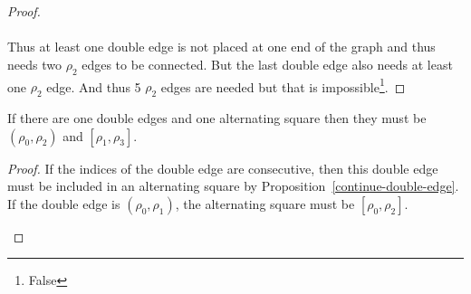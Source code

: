 \begin{proof}
  \paragraph{}
  Thus at least one double edge is not placed at one end of the graph and thus needs two $\rho_2$ edges to be connected. But the last double edge also needs at least one $\rho_2$ edge. And thus 5 $\rho_2$ edges are needed but that is impossible\footnote{False}.

\end{proof}

\begin{lemma}
  If there are one double edges and one alternating square then they must be $(\rho_0, \rho_2)$ and $[\rho_1, \rho_3]$.
\end{lemma}

\begin{proof}
  If the indices of the double edge are consecutive, then this double edge must be included in an alternating square by Proposition~\ref{continue-double-edge}. If the double edge is $(\rho_0, \rho_1)$, the alternating square must be $[\rho_0, \rho_2]$.

  \begin{figure}[H]
    \begin{center}
\end{center}
\end{figure}
\end{proof}
